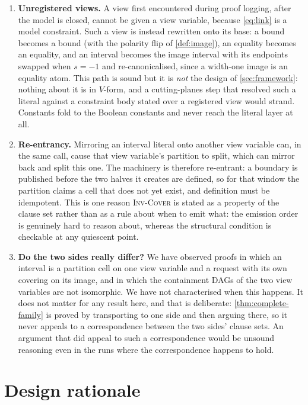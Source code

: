 \documentclass[11pt,a4paper]{article}
\theoremstyle{plain}
\theoremstyle{definition}
\theoremstyle{remark}
\newcommand{\inv}[1]{\textnormal{\textsc{Inv-#1}}}
\newcommand{\invCover}{\inv{Cover}}
\begin{document}
\begin{enumerate}[itemsep=3pt]
\item \textbf{Unregistered views.}  A view first encountered during proof
  logging, after the model is closed, cannot be given a view variable,
  because \cref{eq:link} is a model constraint.  Such a view is instead rewritten
  onto its base: a bound becomes a bound (with the polarity flip of
  \cref{def:image}), an equality becomes an equality, and an interval becomes
  the image interval with its endpoints swapped when $s=-1$ and re-canonicalised,
  since a width-one image is an equality atom.  This path is sound but it is
  \emph{not} the design of \cref{sec:framework}: nothing about it is in
  $V$-form, and a cutting-planes step that resolved such a literal against a
  constraint body stated over a registered view would strand.  Constants fold to
  the Boolean constants and never reach the literal layer at all.

\item \textbf{Re-entrancy.}  Mirroring an interval literal onto another
  view variable can, in the same call, cause that view variable's partition to
  split, which can mirror back and split this one.  The machinery is therefore
  re-entrant: a boundary is published before the two halves it creates are
  defined, so for that window the partition claims a cell that does not yet
  exist, and definition must be idempotent.  This is one reason \invCover{} is
  stated as a property of the clause set rather than as a rule about when to
  emit what: the emission order is genuinely hard to reason about, whereas the
  structural condition is checkable at any quiescent point.

\item \textbf{Do the two sides really differ?}  We have observed proofs in which
  an interval is a partition cell on one view variable and a request with its
  own covering on its image, and in which the containment DAGs of the two view
  variables are not isomorphic.  We have not characterised when this
  happens.  It does not matter for any result here, and that is deliberate:
  \cref{thm:complete-family} is proved by transporting to one side and then
  arguing there, so it never appeals to a correspondence between the two sides'
  clause sets.  An argument that did appeal to such a correspondence would be
  unsound reasoning even in the runs where the correspondence happens to hold.

\end{enumerate}

\section{Design rationale}
\label{sec:rationale}
\end{document}
